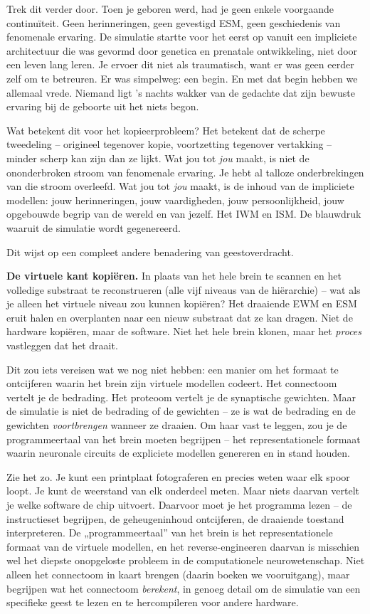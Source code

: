 \documentclass[11pt, twoside, openright]{book}
\begin{document}
Trek dit verder door. Toen je geboren werd, had je geen enkele voorgaande continuïteit. Geen herinneringen, geen gevestigd ESM, geen geschiedenis van fenomenale ervaring. De simulatie startte voor het eerst op vanuit een impliciete architectuur die was gevormd door genetica en prenatale ontwikkeling, niet door een leven lang leren. Je ervoer dit niet als traumatisch, want er was geen eerder zelf om te betreuren. Er was simpelweg: een begin. En met dat begin hebben we allemaal vrede. Niemand ligt 's nachts wakker van de gedachte dat zijn bewuste ervaring bij de geboorte uit het niets begon.

Wat betekent dit voor het kopieerprobleem? Het betekent dat de scherpe tweedeling -- origineel tegenover kopie, voortzetting tegenover vertakking -- minder scherp kan zijn dan ze lijkt. Wat jou tot \textit{jou} maakt, is niet de ononderbroken stroom van fenomenale ervaring. Je hebt al talloze onderbrekingen van die stroom overleefd. Wat jou tot \textit{jou} maakt, is de inhoud van de impliciete modellen: jouw herinneringen, jouw vaardigheden, jouw persoonlijkheid, jouw opgebouwde begrip van de wereld en van jezelf. Het IWM en ISM. De blauwdruk waaruit de simulatie wordt gegenereerd.

Dit wijst op een compleet andere benadering van geestoverdracht.

\textbf{De virtuele kant kopiëren.} In plaats van het hele brein te scannen en het volledige substraat te reconstrueren (alle vijf niveaus van de hiërarchie) -- wat als je alleen het virtuele niveau zou kunnen kopiëren? Het draaiende EWM en ESM eruit halen en overplanten naar een nieuw substraat dat ze kan dragen. Niet de hardware kopiëren, maar de software. Niet het hele brein klonen, maar het \textit{proces} vastleggen dat het draait.

Dit zou iets vereisen wat we nog niet hebben: een manier om het formaat te ontcijferen waarin het brein zijn virtuele modellen codeert. Het connectoom vertelt je de bedrading. Het proteoom vertelt je de synaptische gewichten. Maar de simulatie is niet de bedrading of de gewichten -- ze is wat de bedrading en de gewichten \textit{voortbrengen} wanneer ze draaien. Om haar vast te leggen, zou je de programmeertaal van het brein moeten begrijpen -- het representationele formaat waarin neuronale circuits de expliciete modellen genereren en in stand houden.

Zie het zo. Je kunt een printplaat fotograferen en precies weten waar elk spoor loopt. Je kunt de weerstand van elk onderdeel meten. Maar niets daarvan vertelt je welke software de chip uitvoert. Daarvoor moet je het programma lezen -- de instructieset begrijpen, de geheugeninhoud ontcijferen, de draaiende toestand interpreteren. De „programmeertaal” van het brein is het representationele formaat van de virtuele modellen, en het reverse-engineeren daarvan is misschien wel het diepste onopgeloste probleem in de computationele neurowetenschap. Niet alleen het connectoom in kaart brengen (daarin boeken we vooruitgang), maar begrijpen wat het connectoom \textit{berekent}, in genoeg detail om de simulatie van een specifieke geest te lezen en te hercompileren voor andere hardware.
\end{document}
